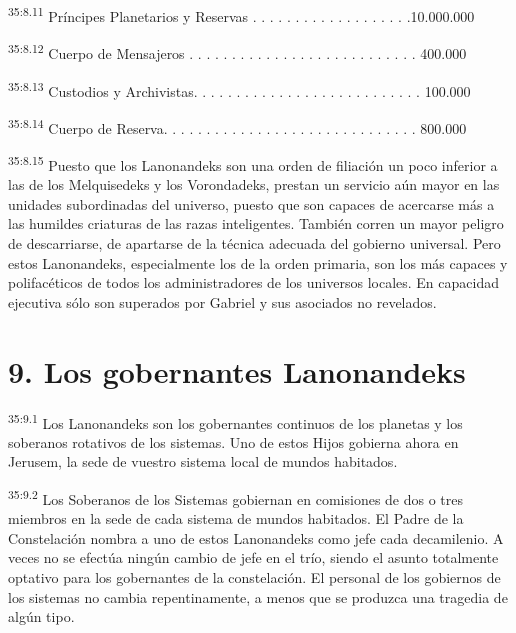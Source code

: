 \par
\textsuperscript{35:8.11} Príncipes Planetarios y Reservas . . . . . . . . . . . . . . . . . . .10.000.000

\par
\textsuperscript{35:8.12} Cuerpo de Mensajeros . . . . . . . . . . . . . . . . . . . . . . . . . . . 400.000

\par
\textsuperscript{35:8.13} Custodios y Archivistas. . . . . . . . . . . . . . . . . . . . . . . . . . . 100.000

\par
\textsuperscript{35:8.14} Cuerpo de Reserva. . . . . . . . . . . . . . . . . . . . . . . . . . . . . . 800.000

\par
\textsuperscript{35:8.15} Puesto que los Lanonandeks son una orden de filiación un poco inferior a las de los Melquisedeks y los Vorondadeks, prestan un servicio aún mayor en las unidades subordinadas del universo, puesto que son capaces de acercarse más a las humildes criaturas de las razas inteligentes. También corren un mayor peligro de descarriarse, de apartarse de la técnica adecuada del gobierno universal. Pero estos Lanonandeks, especialmente los de la orden primaria, son los más capaces y polifacéticos de todos los administradores de los universos locales. En capacidad ejecutiva sólo son superados por Gabriel y sus asociados no revelados.

\section*{9. Los gobernantes Lanonandeks}
\par
\textsuperscript{35:9.1} Los Lanonandeks son los gobernantes continuos de los planetas y los soberanos rotativos de los sistemas. Uno de estos Hijos gobierna ahora en Jerusem, la sede de vuestro sistema local de mundos habitados.

\par
\textsuperscript{35:9.2} Los Soberanos de los Sistemas gobiernan en comisiones de dos o tres miembros en la sede de cada sistema de mundos habitados. El Padre de la Constelación nombra a uno de estos Lanonandeks como jefe cada decamilenio. A veces no se efectúa ningún cambio de jefe en el trío, siendo el asunto totalmente optativo para los gobernantes de la constelación. El personal de los gobiernos de los sistemas no cambia repentinamente, a menos que se produzca una tragedia de algún tipo.


